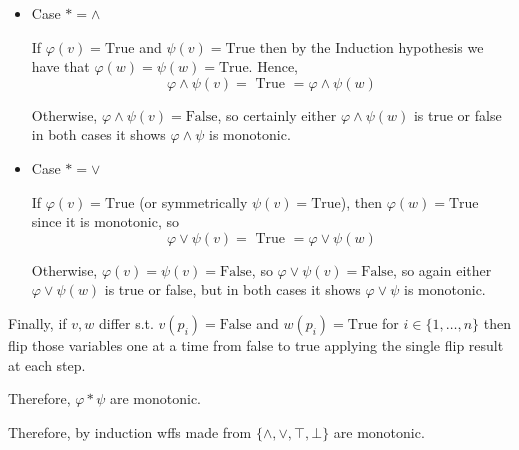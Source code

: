 \documentclass[12pt, letterpaper]{article}
\renewcommand{\t}[1]{\text{#1}}
\begin{document}
\begin{problemproof}
    \begin{itemize}
        \item Case $* = \land$
        
        If $\varphi(v)=\t{True}$ and $\psi(v)=\t{True}$ then by the Induction hypothesis we have that $\varphi(w)=\psi(w)=\t{True}$. Hence,
        \[\varphi \land \psi(v)= \t{ True } = \varphi \land \psi(w)\]

        Otherwise, $\varphi \land \psi(v)= \t{False}$, so certainly either  $\varphi \land \psi(w)$ is true or false in both cases it shows $\varphi \land \psi$ is monotonic.

        \item Case $* = \lor$
        
        If $\varphi(v)=\t{True}$ (or symmetrically $\psi(v)=\t{True}$), then $\varphi(w)=\t{True}$ since it is monotonic, so
        \[\varphi \lor \psi(v)= \t{ True } = \varphi \lor \psi(w)\]

        Otherwise, $\varphi(v)=\psi(v)=\t{False}$, so $\varphi \lor \psi(v) = \t{False}$, so again either $\varphi \lor \psi(w)$ is true or false, but in both cases it shows $\varphi \lor \psi$ is monotonic. 
    \end{itemize}
    Finally, if $v,w$ differ s.t. $v(p_i)=\t{False}$ and $w(p_i)=\t{True}$ for $i \in \{1,\dots,n\}$ then flip those variables one at a time from false to true applying the single flip result at each step.

    Therefore, $\varphi * \psi$ are monotonic.

    Therefore, by induction wffs made from $\{\land, \lor, \top, \bot\}$ are monotonic.
\end{problemproof}
\end{document}

